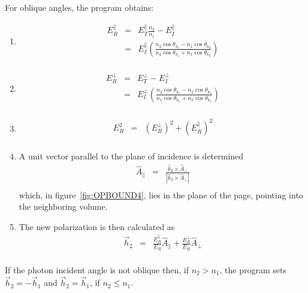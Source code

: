For oblique angles, the program obtains:
\begin{enumerate}
  \item{
    \begin{eqnarray}
      E^{\parallel}_R &=& E^{\parallel}_T\frac{n_2}{n_1} - E^{\parallel}_I \nonumber \\
                      &=& E^{\parallel}_I\left( \frac{n_2\cos\theta_{k_1} - n_1\cos\theta_{k_2}}{n_2\cos\theta_{k_1} + n_1\cos\theta_{k_2}}\right)  \nonumber \\ \nonumber
    \end{eqnarray}
  }
  \item{
    \begin{eqnarray}
      E^{\perp}_R &=& E^{\perp}_T - E^{\perp}_I \nonumber \\
                  &=& E^{\perp}_I\left( \frac{n_2\cos\theta_{k_1} - n_2\cos\theta_{k_2}}{n_1\cos\theta_{k_1} + n_2\cos\theta_{k_2}}\right)  \nonumber \\ \nonumber
    \end{eqnarray}    
  }
  \item{
    \begin{eqnarray}
      E^2_R &=& (E^{\perp}_R)^2 + (E^{\parallel}_R)^2 \nonumber \\ \nonumber
    \end{eqnarray}
  }
  \item{ A unit vector parallel to the plane of incidence is determined
    \begin{eqnarray}
      \hat{A}_{\parallel} &=& \frac{\hat{k}_2\times\hat{A}_{\perp}}{|\hat{k}_2\times\hat{A}_{\perp}|} \nonumber \\ \nonumber
    \end{eqnarray}
    which, in figure~\ref{fig:OPBOUND4}, lies in the plane of the page, pointing into the neighboring volume.
  }
  \item{ The new polarization is then calculated as
    \begin{eqnarray}
      \vec{h}_2 &=& \frac{E^{\parallel}_R}{E_R}\hat{A}_{\parallel} + \frac{E^{\perp}_R}{E_R}\hat{A}_{\perp} \nonumber \\ \label{eq:REFRMOM}
    \end{eqnarray}
  }

\end{enumerate}

If the photon incident angle is not oblique then, if $n_2 > n_1$, the program
sets $\vec{h}_2 = -\vec{h}_1$ and $\vec{h}_2 = \vec{h}_1$, if $n_2 \leq n_1$.

